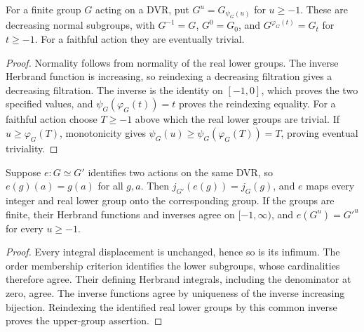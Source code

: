 \begin{lemma}
\label{fw:finite-upper-groups}
\leanok
For a finite group $G$ acting on a DVR, put
$G^u=G_{\psi_G(u)}$ for $u\geq-1$.
These are decreasing normal subgroups, with
$G^{-1}=G$, $G^0=G_0$, and $G^{\varphi_G(t)}=G_t$ for $t\geq-1$.
For a faithful action they are eventually trivial.
\end{lemma}
\begin{proof}
Normality follows from normality of the real lower groups. The inverse
Herbrand function is increasing, so reindexing a decreasing filtration
gives a decreasing filtration. The inverse is the identity on $[-1,0]$,
which proves the two specified values, and
$\psi_G(\varphi_G(t))=t$ proves the reindexing equality.
For a faithful action choose $T\geq-1$ above which the real lower groups
are trivial. If $u\geq\varphi_G(T)$, monotonicity gives
$\psi_G(u)\geq\psi_G(\varphi_G(T))=T$, proving eventual triviality.
\end{proof}

\begin{lemma}
\label{fw:ramification-action-equiv}
\leanok
Suppose $e:G\simeq G'$ identifies two actions on the same DVR, so
$e(g)(a)=g(a)$ for all $g,a$. Then $j_{G'}(e(g))=j_G(g)$, and $e$
maps every integer and real lower group onto the corresponding group.
If the groups are finite, their Herbrand functions and inverses agree
on $[-1,\infty)$, and $e(G^u)=G'^u$ for every $u\geq-1$.
\end{lemma}
\begin{proof}
Every integral displacement is unchanged, hence so is its infimum.
The order membership criterion identifies the lower subgroups, whose
cardinalities therefore agree. Their defining Herbrand integrals, including
the denominator at zero, agree. The inverse functions agree by uniqueness
of the inverse increasing bijection. Reindexing the identified real lower
groups by this common inverse proves the upper-group assertion.
\end{proof}

